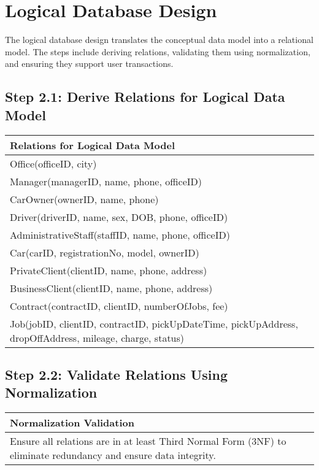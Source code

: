 \documentclass[a4paper,12pt]{article}
\begin{document}
\newpage

\section*{Logical Database Design}
The logical database design translates the conceptual data model into a relational model. The steps include deriving relations, validating them using normalization, and ensuring they support user transactions.

\subsection*{Step 2.1: Derive Relations for Logical Data Model}
\begin{table}[H]
\centering
\begin{tabularx}{\textwidth}{|X|}
\hline
\rowcolor{green!20} \textbf{Relations for Logical Data Model} \\
\hline
Office(officeID, city) \\
\hline
Manager(managerID, name, phone, officeID) \\
\hline
CarOwner(ownerID, name, phone) \\
\hline
Driver(driverID, name, sex, DOB, phone, officeID) \\
\hline
AdministrativeStaff(staffID, name, phone, officeID) \\
\hline
Car(carID, registrationNo, model, ownerID) \\
\hline
PrivateClient(clientID, name, phone, address) \\
\hline
BusinessClient(clientID, name, phone, address) \\
\hline
Contract(contractID, clientID, numberOfJobs, fee) \\
\hline
Job(jobID, clientID, contractID, pickUpDateTime, pickUpAddress, dropOffAddress, mileage, charge, status) \\
\hline
\end{tabularx}
\end{table}

\subsection*{Step 2.2: Validate Relations Using Normalization}
\begin{table}[H]
\centering
\begin{tabularx}{\textwidth}{|X|}
\hline
\rowcolor{green!20} \textbf{Normalization Validation} \\
\hline
Ensure all relations are in at least Third Normal Form (3NF) to eliminate redundancy and ensure data integrity. \\
\hline
\end{tabularx}
\end{table}
\end{document}
